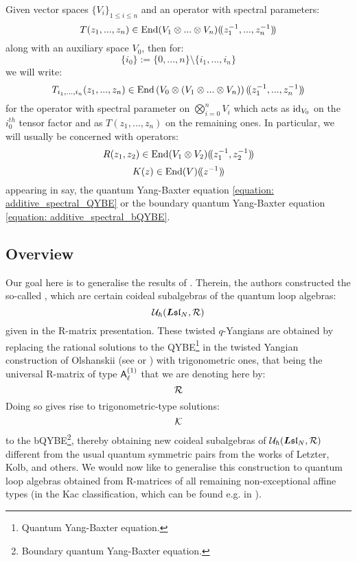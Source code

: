         Given vector spaces $\{V_i\}_{1 \leq i \leq n}$ and an operator with spectral parameters:
            $$T(z_1, ..., z_n) \in \End(V_1 \tensor ... \tensor V_n)(\!(z_1^{-1}, ..., z_n^{-1})\!)$$
        along with an auxiliary space $V_0$, then for:
            $$\{i_0\} := \{0, ..., n\} \setminus \{i_1, ..., i_n\}$$
        we will write:
            $$T_{i_1, ..., i_n}(z_1, ..., z_n) \in \End\left(V_0 \tensor (V_1 \tensor ... \tensor V_n)\right)(\!(z_1^{-1}, ..., z_n^{-1})\!)$$
        for the operator with spectral parameter on $\bigotimes_{i = 0}^n V_i$ which acts as $\mathrm{id}_{V_0}$ on the $i_0^{th}$ tensor factor and as $T(z_1, ..., z_n)$ on the remaining ones. In particular, we will usually be concerned with operators:
            $$R(z_1, z_2) \in \End(V_1 \tensor V_2)(\!(z_1^{-1}, z_2^{-1})\!)$$
            $$K(z) \in \operatorname{End}(V)(\!(z^{-1})\!)$$
        appearing in say, the quantum Yang-Baxter equation \eqref{equation: additive_spectral_QYBE} or the boundary quantum Yang-Baxter equation \eqref{equation: additive_spectral_bQYBE}.

    \subsection{Overview}
        Our goal here is to generalise the results of \cite{molev_ragoucy_sorba_twisted_q_yangians_type_A}. Therein, the authors constructed the so-called , which are certain coideal subalgebras of the quantum loop algebras:
            $$\mathcal{U}_{\hbar}(\boldsymbol{L}\mathfrak{sl}_N, \mathcal{R})$$
        given in the R-matrix presentation. These twisted $q$-Yangians are obtained by replacing the rational solutions to the QYBE\footnote{Quantum Yang-Baxter equation.} in the twisted Yangian construction of Olshanskii (see \cite{olshanski_twisted_yangians_and_infinite_dimensional_classical_lie_algebras} or \cite[Chapter 2]{molev_yangians_and_classical_lie_algebras}) with trigonometric ones, that being the universal R-matrix of type $\mathsf{A}_{\ell}^{(1)}$ that we are denoting here by: 
            $$\mathcal{R}$$
        Doing so gives rise to trigonometric-type solutions:
            $$\mathcal{K}$$
        to the bQYBE\footnote{Boundary quantum Yang-Baxter equation.}, thereby obtaining new coideal subalgebras of $\mathcal{U}_{\hbar}(\boldsymbol{L}\mathfrak{sl}_N, \mathcal{R})$ different from the usual quantum symmetric pairs from the works of Letzter, Kolb, and others. We would now like to generalise this construction to quantum loop algebras obtained from R-matrices of all remaining non-exceptional affine types (in the Kac classification, which can be found e.g. in \cite[Chapter 4]{kac_infinite_dimensional_lie_algebras}). 

